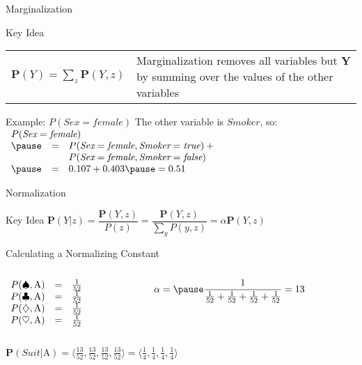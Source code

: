 \documentclass[14pt]{beamer}
\begin{document}
\begin{frame}{Marginalization}
\begin{block}{Key Idea}
\begin{tabular}{lm{}}
$
\mathbf{P}(Y) = \sum\limits_{z}{\mathbf{P}(Y, z)}
$
&
\alert{Marginalization} removes all variables but $\mathbf{Y}$ by summing over the values of the other variables
\end{tabular}
\end{block}
\pause
\begin{block}{Example: $P(\textit{Sex}=\textit{female})$}
The other variable is $\textit{Smoker}$, so: \\[.5em]
$
\begin{array}{lll}
\lefteqn{P(\textit{Sex}=\textit{female})} \\
\pause & = & P(\textit{Sex}=\textit{female},\textit{Smoker}=\textit{true}) + \mbox{}\\
&   & P(\textit{Sex}=\textit{female},\textit{Smoker}=\textit{false})\\
\pause & = & 0.107 + 0.403 \pause = 0.51
\end{array}
$
\end{block}
\end{frame}

\begin{frame}{Normalization}
\begin{block}{Key Idea}
$
\mathbf{P}(Y|z) = \dfrac{\mathbf{P}(Y,z)}{P(z)} = \dfrac{\mathbf{P}(Y,z)}{\sum\limits_{y} P(y, z)} = \alpha\mathbf{P}(Y,z)
$
\end{block}
\pause
\begin{block}{Calculating a Normalizing Constant}
\begin{columns}
\begin{column}{0.35\textwidth}
$\begin{array}{ l l l }
P(\spadesuit,\mbox{A}) & = & \frac{1}{52} \\
P(\clubsuit,\mbox{A}) & = & \frac{1}{52} \\
P(\diamondsuit,\mbox{A}) & = & \frac{1}{52} \\
P(\heartsuit,\mbox{A}) & = & \frac{1}{52}
\end{array}$
\end{column}
\pause
\begin{column}{0.6\textwidth}
$\alpha = \pause \dfrac{1}{\frac{1}{52} + \frac{1}{52} + \frac{1}{52} + \frac{1}{52}} = 13$
\end{column}
\end{columns}
\bigskip
\centering
\pause
$\mathbf{P}(Suit|\mbox{A})
= \langle \frac{13}{52}, \frac{13}{52}, \frac{13}{52}, \frac{13}{52} \rangle
= \langle \frac{1}{4}, \frac{1}{4}, \frac{1}{4}, \frac{1}{4} \rangle$
\end{block}
\end{frame}
\end{document}
